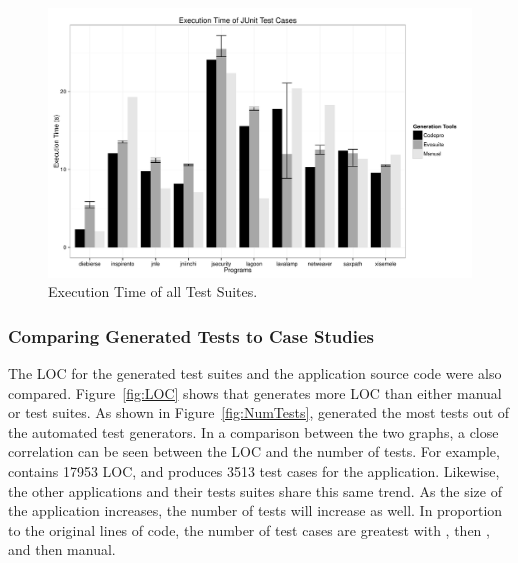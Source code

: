 \begin{figure}[!t]
\centering
  \includegraphics[scale=0.5]{RGraphs/TestExecutionTime.pdf}
    \caption{Execution Time of all Test Suites.}
  \label{fig:TestExecTime}
\end{figure}

\subsubsection{Comparing Generated Tests to Case Studies}



The LOC for the generated test suites and the application source code were also compared. Figure~\ref{fig:LOC} shows that \codepro generates more LOC than either manual or \evo test suites. As shown in Figure~\ref{fig:NumTests}, \codepro generated the most tests out of the automated test generators. In a comparison between the two graphs, a close correlation can be seen between the LOC and the number of tests. For example, \netweaver contains 17953 LOC, and \codepro produces 3513 test cases for the application. Likewise, the other applications and their tests suites share this same trend. As the size of the application increases, the number of tests will increase as well. In proportion to the original lines of code, the number of test cases are greatest with \codepro, then \evo, and then manual. 
 
